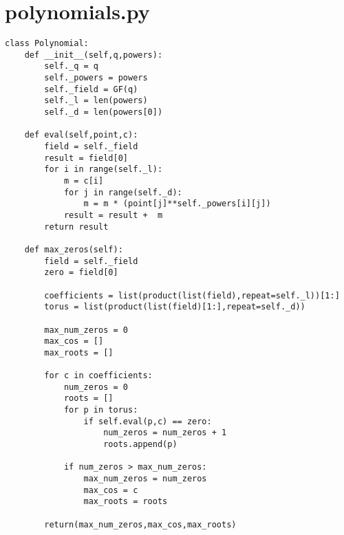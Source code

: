 \documentclass[12pt]{amsart}
\theoremstyle{plain}
\begin{document}
\section{polynomials.py}
\begin{verbatim}
class Polynomial:
    def __init__(self,q,powers):
        self._q = q
        self._powers = powers
        self._field = GF(q)
        self._l = len(powers)
        self._d = len(powers[0])

    def eval(self,point,c):
        field = self._field
        result = field[0]
        for i in range(self._l):
            m = c[i]
            for j in range(self._d):
                m = m * (point[j]**self._powers[i][j])
            result = result +  m
        return result

    def max_zeros(self):
        field = self._field
        zero = field[0]

        coefficients = list(product(list(field),repeat=self._l))[1:]
        torus = list(product(list(field)[1:],repeat=self._d))

        max_num_zeros = 0
        max_cos = []
        max_roots = []

        for c in coefficients:
            num_zeros = 0
            roots = []
            for p in torus:
                if self.eval(p,c) == zero:
                    num_zeros = num_zeros + 1
                    roots.append(p)

            if num_zeros > max_num_zeros:
                max_num_zeros = num_zeros
                max_cos = c
                max_roots = roots

        return(max_num_zeros,max_cos,max_roots)


\end{verbatim}
\end{document}
